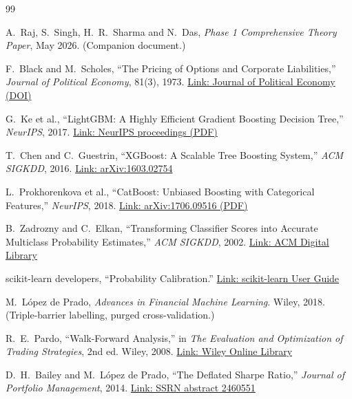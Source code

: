 \documentclass[10pt,a4paper]{article}
\begin{document}
\begin{thebibliography}{99}
\small

 A.~Raj, S.~Singh, H.~R.~Sharma and N.~Das,
\emph{Phase 1 Comprehensive Theory Paper}, May 2026. (Companion document.)

 F.~Black and M.~Scholes, ``The Pricing of Options and
Corporate Liabilities,'' \emph{Journal of Political Economy}, 81(3), 1973.
\href{https://doi.org/10.1086/260062}{Link: Journal of Political Economy (DOI)}

 G.~Ke et al., ``LightGBM: A Highly Efficient Gradient
Boosting Decision Tree,'' \emph{NeurIPS}, 2017.
\href{https://proceedings.neurips.cc/paper/2017/file/6449f44a102fde848669bdd9eb6b76fa-Paper.pdf}{Link: NeurIPS proceedings (PDF)}

 T.~Chen and C.~Guestrin, ``XGBoost: A Scalable Tree Boosting
System,'' \emph{ACM SIGKDD}, 2016.
\href{https://arxiv.org/abs/1603.02754}{Link: arXiv:1603.02754}

 L.~Prokhorenkova et al., ``CatBoost: Unbiased Boosting with
Categorical Features,'' \emph{NeurIPS}, 2018.
\href{https://arxiv.org/pdf/1706.09516}{Link: arXiv:1706.09516 (PDF)}

 B.~Zadrozny and C.~Elkan, ``Transforming Classifier Scores
into Accurate Multiclass Probability Estimates,'' \emph{ACM SIGKDD}, 2002.
\href{https://dl.acm.org/doi/10.1145/775047.775151}{Link: ACM Digital Library}

 scikit-learn developers, ``Probability Calibration.''
\href{https://scikit-learn.org/stable/modules/calibration.html}{Link: scikit-learn User Guide}

 M.~L\'opez de Prado, \emph{Advances in Financial Machine
Learning}. Wiley, 2018. (Triple-barrier labelling, purged cross-validation.)

 R.~E.~Pardo, ``Walk-Forward Analysis,'' in \emph{The Evaluation
and Optimization of Trading Strategies}, 2nd ed. Wiley, 2008.
\href{https://onlinelibrary.wiley.com/doi/abs/10.1002/9781119196969.ch11}{Link: Wiley Online Library}

 D.~H.~Bailey and M.~L\'opez de Prado, ``The Deflated
Sharpe Ratio,'' \emph{Journal of Portfolio Management}, 2014.
\href{https://papers.ssrn.com/sol3/papers.cfm?abstract_id=2460551}{Link: SSRN abstract 2460551}


\end{thebibliography}
\end{document}
